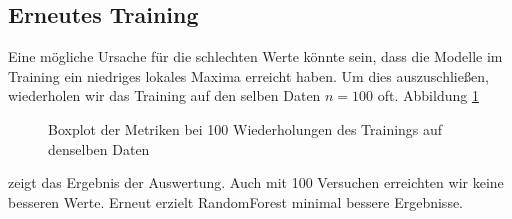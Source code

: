 \documentclass[a4paper,10pt]{scrartcl}
\begin{document}
\subsection{Erneutes Training}
Eine mögliche Ursache für die schlechten Werte könnte sein, dass die Modelle im Training ein niedriges lokales Maxima erreicht haben. Um dies auszuschließen, wiederholen wir das Training auf den selben Daten $n=100$ oft. Abbildung \ref{fig:localminimum}
\begin{figure}[h]
	\centering
	\caption{Boxplot der Metriken bei 100 Wiederholungen des Trainings auf denselben Daten}
	\label{fig:localminimum}
\end{figure} 
zeigt das Ergebnis der Auswertung. Auch mit 100 Versuchen erreichten wir keine besseren Werte. Erneut erzielt RandomForest minimal bessere Ergebnisse.
\end{document}
